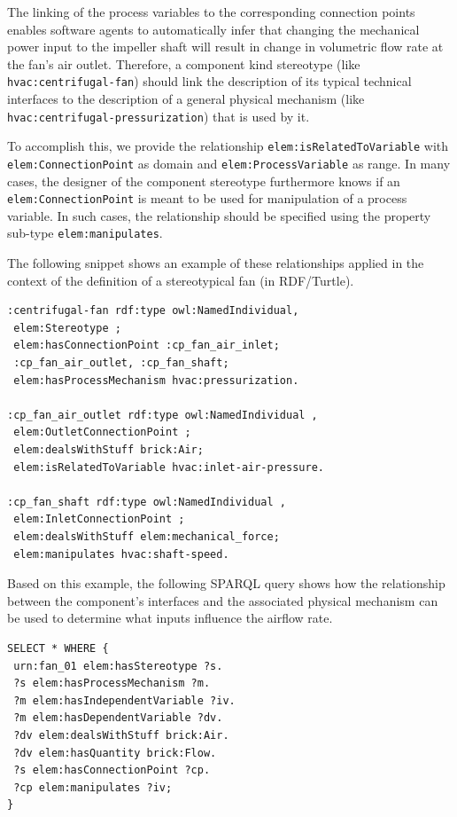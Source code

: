 \documentclass[sigconf]{acmart}
\begin{document}
The linking of the process variables to the corresponding connection points enables software agents to automatically infer that changing the  mechanical power input to  the impeller shaft will result in change in volumetric flow rate at the fan's air outlet.
Therefore, a component kind stereotype (like \texttt{hvac:centrifugal-fan}) should link the description of its typical technical interfaces to the description of a general physical mechanism (like \texttt{hvac:\-cen\-tri\-fug\-al-pr\-ess\-uri\-za\-ti\-on}) that is used by it.

To accomplish this, we provide the relationship \texttt{elem:is\-Re\-la\-ted\-To\-Va\-ri\-able} with \texttt{elem:Connection\-Point} as domain and \texttt{elem:Process\-Variable} as range.
In many cases, the designer of the component stereotype furthermore knows if an \texttt{elem:Conn\-ec\-tion\-Point} is meant to be used for manipulation of a process variable.
In such cases, the relationship should be specified using the property sub-type \texttt{elem:manipulates}. 
%

The following snippet shows an example of these relationships applied in the context of the definition of a stereotypical fan (in RDF/Turtle).

\begin{lstlisting}[language=SPARQL]
:centrifugal-fan rdf:type owl:NamedIndividual,
 elem:Stereotype ; 
 elem:hasConnectionPoint :cp_fan_air_inlet; 
 :cp_fan_air_outlet, :cp_fan_shaft;
 elem:hasProcessMechanism hvac:pressurization.

:cp_fan_air_outlet rdf:type owl:NamedIndividual ,
 elem:OutletConnectionPoint ;
 elem:dealsWithStuff brick:Air;
 elem:isRelatedToVariable hvac:inlet-air-pressure.

:cp_fan_shaft rdf:type owl:NamedIndividual ,
 elem:InletConnectionPoint ;
 elem:dealsWithStuff elem:mechanical_force;
 elem:manipulates hvac:shaft-speed.
\end{lstlisting}

Based on this example, the following SPARQL query shows how the relationship between the component's interfaces and the associated physical mechanism can be used to determine what inputs influence the airflow rate.

\begin{lstlisting}[language=SPARQL]
SELECT * WHERE {
 urn:fan_01 elem:hasStereotype ?s.
 ?s elem:hasProcessMechanism ?m.
 ?m elem:hasIndependentVariable ?iv.
 ?m elem:hasDependentVariable ?dv.
 ?dv elem:dealsWithStuff brick:Air. 
 ?dv elem:hasQuantity brick:Flow.
 ?s elem:hasConnectionPoint ?cp.
 ?cp elem:manipulates ?iv;
}
\end{lstlisting}
\vspace{-5mm}
\end{document}
